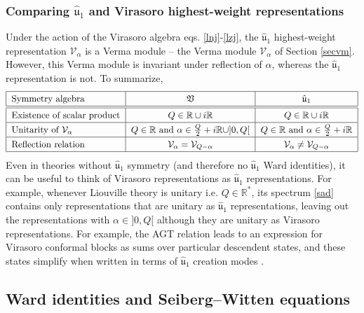 \documentclass[12pt, a4paper, notitlepage, twoside]{report}
\numberwithin{equation}{section}
\theoremstyle{break}
\begin{document}
\subsubsection{Comparing $\hat{\mathfrak{u}}_1$ and Virasoro highest-weight representations}

Under the action of the Virasoro algebra eqs. \eqref{lnj}-\eqref{lzj}, the $\hat{\mathfrak{u}}_1$ highest-weight representation $\mathcal{V}_\alpha$ is a Verma module -- the Verma module $\mathcal{V}_\alpha$ of Section \ref{secvm}.
However, this Verma module is invariant under reflection of $\alpha$, whereas the $\hat{\mathfrak{u}}_1$ representation is not.
To summarize,
\begin{align}
\renewcommand{\arraystretch}{1.3}
 \begin{tabular}{|l|c|c|}
  \hline
 Symmetry algebra  & $\mathfrak{V}$ & $\hat{\mathfrak{u}}_1 $
\\
\hline\hline
 Existence of scalar product & $Q\in {\mathbb{R}} \cup i{\mathbb{R}} $ & $Q\in {\mathbb{R}} \cup i{\mathbb{R}}$ 
\\
\hline
 Unitarity of $\mathcal{V}_\alpha$ & $Q\in\mathbb{R}$ and $\alpha\in \frac{Q}{2}+i{\mathbb{R}} \cup ]0,Q[ $ &  $Q\in\mathbb{R}$ and $\alpha \in \frac{Q}{2}+i{\mathbb{R}}$
\\
\hline 
 Reflection relation  & $\mathcal{V}_\alpha = \mathcal{V}_{Q-\alpha} $ & $\mathcal{V}_\alpha \neq \mathcal{V}_{Q-\alpha} $ 
\\
\hline
 \end{tabular}
\end{align}
Even in theories without $\hat{\mathfrak{u}}_1$ symmetry (and therefore no $\hat{\mathfrak{u}}_1$ Ward identities), 
it can be useful to think of Virasoro representations as $\hat{\mathfrak{u}}_1$ representations. 
For example,
whenever Liouville theory is unitary i.e. $Q\in\mathbb{R}^*$, its spectrum \eqref{sad} contains only representations that are unitary as $\hat{\mathfrak{u}}_1$ representations, leaving out the representations with $\alpha\in ]0, Q[$ although they are unitary as Virasoro representations. 
For example, the AGT relation leads to an expression for Virasoro conformal blocks as sums over particular descendent states, and these states simplify when written in terms of $\hat{\mathfrak{u}}_1$ creation modes \cite{aflt10}.


\subsection{Ward identities and Seiberg--Witten equations}
\end{document}
